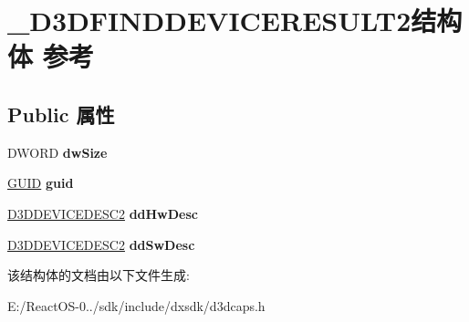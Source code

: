 \hypertarget{struct___d3_d_f_i_n_d_d_e_v_i_c_e_r_e_s_u_l_t2}{}\section{\+\_\+\+D3\+D\+F\+I\+N\+D\+D\+E\+V\+I\+C\+E\+R\+E\+S\+U\+L\+T2结构体 参考}
\label{struct___d3_d_f_i_n_d_d_e_v_i_c_e_r_e_s_u_l_t2}
\subsection*{Public 属性}
\begin{DoxyCompactItemize}
\item 
\mbox{\label{struct___d3_d_f_i_n_d_d_e_v_i_c_e_r_e_s_u_l_t2_aae050db59ac6be59643ab2ac3d7b6c8e}} 
D\+W\+O\+RD {\bfseries dw\+Size}
\item 
\mbox{\label{struct___d3_d_f_i_n_d_d_e_v_i_c_e_r_e_s_u_l_t2_a20d28cb086a6998536c9dc0a2d995332}} 
\hyperlink{interface_g_u_i_d}{G\+U\+ID} {\bfseries guid}
\item 
\mbox{\label{struct___d3_d_f_i_n_d_d_e_v_i_c_e_r_e_s_u_l_t2_ae660fe9224b348153ae01f9569d83077}} 
\hyperlink{struct___d3_d_device_desc2}{D3\+D\+D\+E\+V\+I\+C\+E\+D\+E\+S\+C2} {\bfseries dd\+Hw\+Desc}
\item 
\mbox{\label{struct___d3_d_f_i_n_d_d_e_v_i_c_e_r_e_s_u_l_t2_aa5e4827c1884496eddc3bda170f0ac6d}} 
\hyperlink{struct___d3_d_device_desc2}{D3\+D\+D\+E\+V\+I\+C\+E\+D\+E\+S\+C2} {\bfseries dd\+Sw\+Desc}
\end{DoxyCompactItemize}


该结构体的文档由以下文件生成\+:\begin{DoxyCompactItemize}
\item 
E\+:/\+React\+O\+S-\/0../sdk/include/dxsdk/d3dcaps.\+h\end{DoxyCompactItemize}
